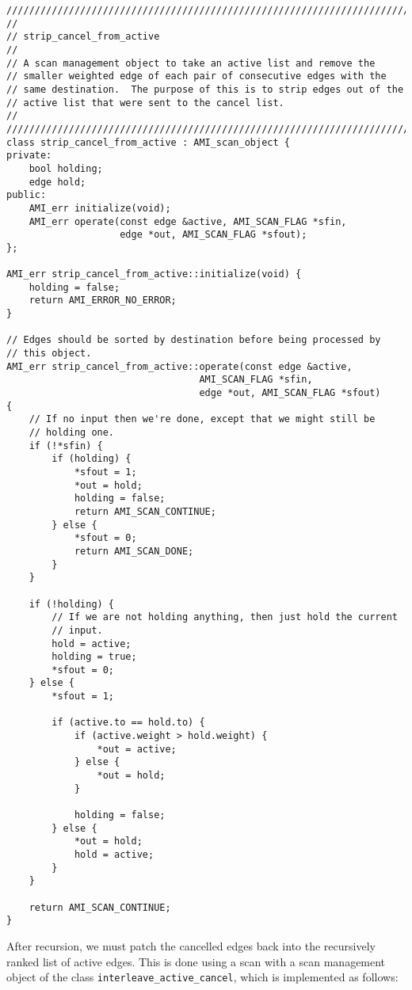 \begin{verbatim}
////////////////////////////////////////////////////////////////////////
//
// strip_cancel_from_active
//
// A scan management object to take an active list and remove the
// smaller weighted edge of each pair of consecutive edges with the
// same destination.  The purpose of this is to strip edges out of the
// active list that were sent to the cancel list.
//
////////////////////////////////////////////////////////////////////////
class strip_cancel_from_active : AMI_scan_object {
private:
    bool holding;
    edge hold;
public:
    AMI_err initialize(void);  
    AMI_err operate(const edge &active, AMI_SCAN_FLAG *sfin,
                    edge *out, AMI_SCAN_FLAG *sfout);
};

AMI_err strip_cancel_from_active::initialize(void) {
    holding = false;
    return AMI_ERROR_NO_ERROR;
}

// Edges should be sorted by destination before being processed by
// this object.
AMI_err strip_cancel_from_active::operate(const edge &active,
                                  AMI_SCAN_FLAG *sfin,
                                  edge *out, AMI_SCAN_FLAG *sfout)
{
    // If no input then we're done, except that we might still be
    // holding one.
    if (!*sfin) {
        if (holding) {
            *sfout = 1;
            *out = hold;
            holding = false;
            return AMI_SCAN_CONTINUE;
        } else {
            *sfout = 0;
            return AMI_SCAN_DONE;
        }
    }

    if (!holding) {
        // If we are not holding anything, then just hold the current
        // input.
        hold = active;
        holding = true;
        *sfout = 0;
    } else {
        *sfout = 1;
        
        if (active.to == hold.to) {
            if (active.weight > hold.weight) {
                *out = active;
            } else {
                *out = hold;
            }

            holding = false;
        } else {
            *out = hold;
            hold = active;
        }
    }

    return AMI_SCAN_CONTINUE;
}
\end{verbatim}

After recursion, we must patch the cancelled edges back into the
recursively ranked list of active edges.  This is done using a scan
with a scan management object of the class
\verb|interleave_active_cancel|, which is implemented as follows:

